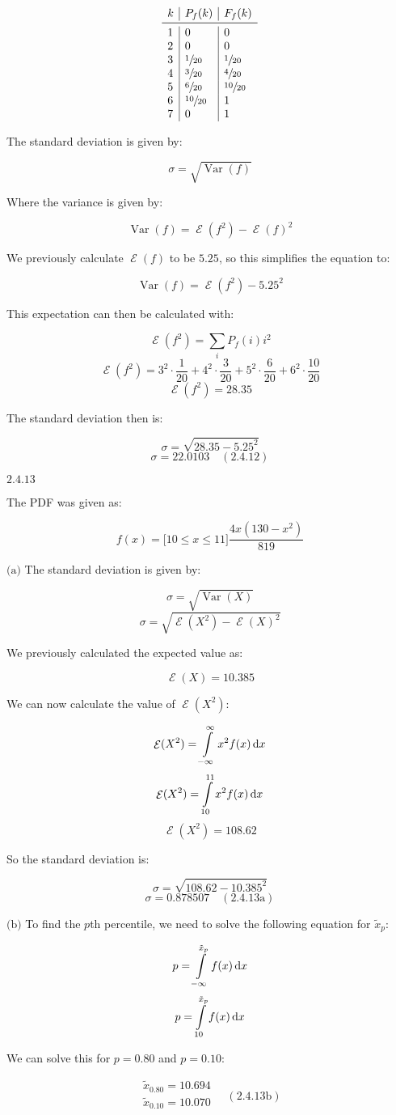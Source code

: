 \documentclass{article}
\newcommand{\problem}[2]{$\boxed{\text{#1.#2}}$}
\newcommand{\subproblem}[3]{$\boxed{\text{(#3)}}$}
\newcommand{\solution}[3]{\boxed{#3\quad(\text{#1.#2})}}
\newcommand{\subsolution}[4]{\boxed{#4\quad(\text{#1.#2#3})}}
\renewcommand{\d}[1]{\,\textnormal{d}#1}
\DeclareMathOperator{\var}{Var}
\DeclareMathOperator{\E}{\mathcal{E}}
\begin{document}
\[
\begin{array}{l|l|l}
k & P_f(k) & F_f(k) \\
\midrule
1 & 0 & 0 \\
2 & 0 & 0 \\
3 & \sfrac{1}{20} & \sfrac{1}{20} \\
4 & \sfrac{3}{20} & \sfrac{4}{20} \\
5 & \sfrac{6}{20} & \sfrac{10}{20} \\
6 & \sfrac{10}{20} & 1 \\
7 & 0 & 1 \\
\end{array}
\]

The standard deviation is given by:

\[
\sigma=\sqrt{\var(f)}
\]

Where the variance is given by:

\[
\var(f)=\E(f^2)-\E(f)^2
\]

We previously calculate $\E(f)$ to be $5.25$, so this simplifies the
equation to:

\[
\var(f)=\E(f^2)-5.25^2
\]

This expectation can then be calculated with:

\[
\E(f^2)=\sum\limits_i P_f(i) i^2
\] \[
\E(f^2)=3^2\cdot\frac{1}{20}+4^2\cdot\frac{3}{20}+5^2\cdot\frac{6}{20}+6^2\cdot\frac{10}{20}
\] \[
\E(f^2)=28.35
\]

The standard deviation then is:

\[
\sigma=\sqrt{28.35-5.25^2}
\] \[
\solution{2.4}{12}{\sigma=22.0103}
\]

%
\problem{2.4}{13}

The PDF was given as:

\[
f(x)=\lbrack10\le x\le11\rbrack \frac{4x(130-x^2)}{819}
\]

%
\subproblem{2.4}{13}{a} The standard deviation is given by:

\[
\sigma=\sqrt{\var(X)}
\] \[
\sigma=\sqrt{\E(X^2)-\E(X)^2}
\]

We previously calculated the expected value as:

\[
\E(X)=10.385
\]

We can now calculate the value of $\E(X^2)$:

\[
\E(X^2)=\int\limits_{-\infty}^\infty x^2 f(x)\d{x}
\] \[
\E(X^2)=\int\limits_{10}^{11} x^2 f(x)\d{x}
\] \[
\E(X^2)=108.62
\]

So the standard deviation is:

\[
\sigma=\sqrt{108.62-10.385^2}
\] \[
\subsolution{2.4}{13}{a}{\sigma=0.878507}
\]

%
\subproblem{2.4}{13}{b} To find the $p$th percentile, we need to solve
the following equation for $\tilde{x}_p$:

\[
p = \int\limits_{-\infty}^{\tilde{x}_p} f(x)\d{x}
\] \[
p = \int\limits_{10}^{\tilde{x}_p} f(x)\d{x}
\]

We can solve this for $p=0.80$ and $p=0.10$:

\[
\subsolution{2.4}{13}{b}{\begin{array}{l}
\tilde{x}_{0.80}=10.694 \\
\tilde{x}_{0.10}=10.070 \\
\end{array}}
\]
\end{document}
